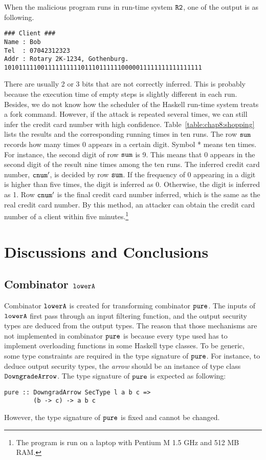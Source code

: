 \documentclass{report}
\newcommand{\co}[1]{$\cod{#1}$}
\begin{document}
When the malicious program runs in run-time system \co{R2}, one of the output is as following.
\begin{Verbatim}[fontsize=\small]
### Client ###
Name : Bob
Tel  : 07042312323
Addr : Rotary 2K-1234, Gothenburg.
101011111001111111111011101111110000011111111111111111
\end{Verbatim}
There are usually 2 or 3 bits that are not correctly inferred. This is probably because the execution time of 
empty steps is slightly different in each run. Besides, we do not know how the scheduler of the Haskell run-time
system treats a fork command.
However, if the attack is repeated several times, we can still infer the credit card number with high
confidence. Table~\ref{table:chap8:shopping} lists the results and the corresponding running times in ten runs. 
The row \co{sum} records how many times 0 appears in a certain digit. Symbol * means ten times.
For instance, the second digit of row \co{sum} is 9. This means that 0 appears in the second digit
of the result nine times among the ten runs. The inferred credit card number, \co{cnum'}, is decided by row \co{sum}.
If the frequency of 0 appearing in a digit is higher than five times, the digit is inferred as 0.
Otherwise, the digit is inferred as 1. Row \co{cnum'} is the final credit card number inferred, which
is the same as the real credit card number. By this method, an attacker can obtain the credit card number of a client
within five minutes.\footnote{The program is run on a laptop with Pentium M 1.5 GHz and 512 MB RAM.}




\chapter{Discussions and Conclusions}

\section{Combinator \co{lowerA}}
Combinator \co{lowerA} is created for transforming combinator \co{pure}.
The inputs of \co{lowerA} first pass through an input filtering function, and
the output security types are deduced from the output types.
The reason that those mechanisms are not implemented in combinator \co{pure}
is because every type used has to implement overloading functions in some Haskell type classes.
To be generic, some type constraints are required in the type signature of
\co{pure}. For instance, to deduce output security types, the {\em arrow} should be
an instance of type class \co{DowngradeArrow}. The type signature of \co{pure}
is expected as following:
\begin{Verbatim}[fontsize=\small]
pure :: DowngradArrow SecType l a b c => 
        (b -> c) -> a b c
\end{Verbatim}
However, the type signature of \co{pure} is fixed and cannot be changed.
\end{document}
